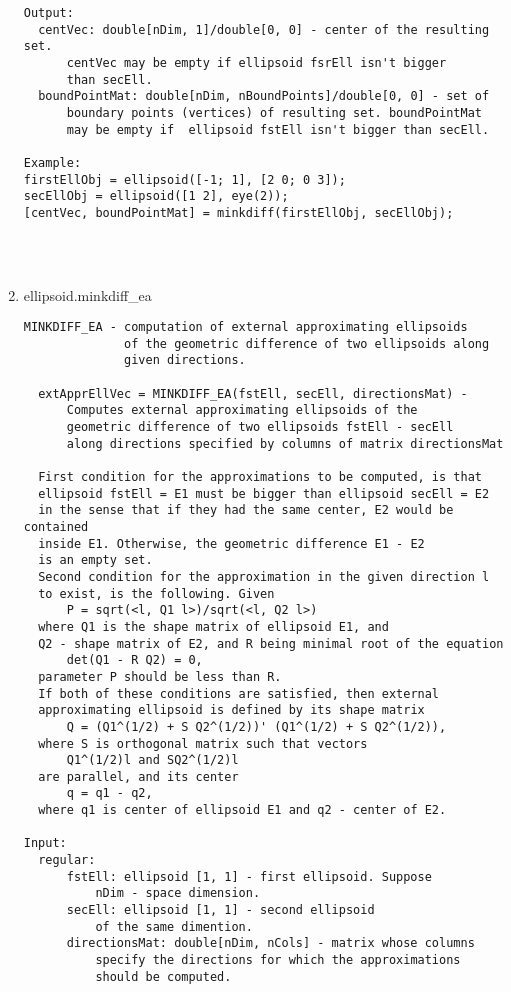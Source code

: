 \begin{enumerate}
\begin{lstlisting}
Output:
  centVec: double[nDim, 1]/double[0, 0] - center of the resulting set.
      centVec may be empty if ellipsoid fsrEll isn't bigger
      than secEll.
  boundPointMat: double[nDim, nBoundPoints]/double[0, 0] - set of
      boundary points (vertices) of resulting set. boundPointMat
      may be empty if  ellipsoid fstEll isn't bigger than secEll.

Example:
firstEllObj = ellipsoid([-1; 1], [2 0; 0 3]);
secEllObj = ellipsoid([1 2], eye(2));
[centVec, boundPointMat] = minkdiff(firstEllObj, secEllObj);




\end{lstlisting}
\fontfamily{\familydefault}
\selectfont
\item {ellipsoid.minkdiff\_ea}
\selectfont
\begin{lstlisting}
MINKDIFF_EA - computation of external approximating ellipsoids
              of the geometric difference of two ellipsoids along
              given directions.

  extApprEllVec = MINKDIFF_EA(fstEll, secEll, directionsMat) -
      Computes external approximating ellipsoids of the
      geometric difference of two ellipsoids fstEll - secEll
      along directions specified by columns of matrix directionsMat

  First condition for the approximations to be computed, is that
  ellipsoid fstEll = E1 must be bigger than ellipsoid secEll = E2
  in the sense that if they had the same center, E2 would be contained
  inside E1. Otherwise, the geometric difference E1 - E2
  is an empty set.
  Second condition for the approximation in the given direction l
  to exist, is the following. Given
      P = sqrt(<l, Q1 l>)/sqrt(<l, Q2 l>)
  where Q1 is the shape matrix of ellipsoid E1, and
  Q2 - shape matrix of E2, and R being minimal root of the equation
      det(Q1 - R Q2) = 0,
  parameter P should be less than R.
  If both of these conditions are satisfied, then external
  approximating ellipsoid is defined by its shape matrix
      Q = (Q1^(1/2) + S Q2^(1/2))' (Q1^(1/2) + S Q2^(1/2)),
  where S is orthogonal matrix such that vectors
      Q1^(1/2)l and SQ2^(1/2)l
  are parallel, and its center
      q = q1 - q2,
  where q1 is center of ellipsoid E1 and q2 - center of E2.

Input:
  regular:
      fstEll: ellipsoid [1, 1] - first ellipsoid. Suppose
          nDim - space dimension.
      secEll: ellipsoid [1, 1] - second ellipsoid
          of the same dimention.
      directionsMat: double[nDim, nCols] - matrix whose columns
          specify the directions for which the approximations
          should be computed.


\end{lstlisting}
\end{enumerate}
